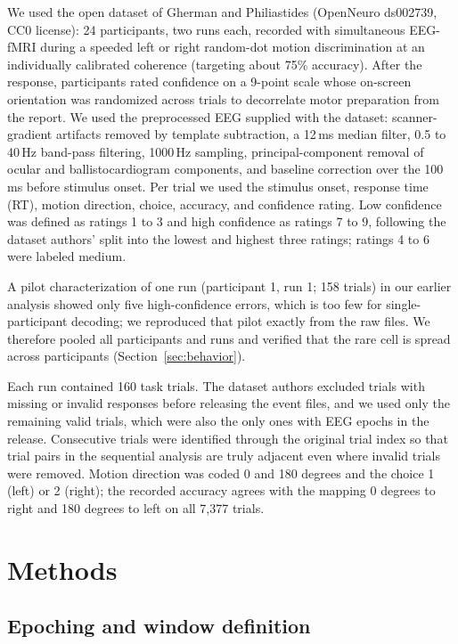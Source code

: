 \documentclass[11pt,a4paper]{article}
\begin{document}
We used the open dataset of Gherman and Philiastides \cite{r1,r2} (OpenNeuro ds002739, CC0 license): 24 participants, two runs each, recorded with simultaneous EEG-fMRI during a speeded left or right random-dot motion discrimination at an individually calibrated coherence (targeting about 75\% accuracy). After the response, participants rated confidence on a 9-point scale whose on-screen orientation was randomized across trials to decorrelate motor preparation from the report. We used the preprocessed EEG supplied with the dataset: scanner-gradient artifacts removed by template subtraction, a 12\,ms median filter, 0.5 to 40\,Hz band-pass filtering, 1000\,Hz sampling, principal-component removal of ocular and ballistocardiogram components, and baseline correction over the 100\,ms before stimulus onset. Per trial we used the stimulus onset, response time (RT), motion direction, choice, accuracy, and confidence rating. Low confidence was defined as ratings 1 to 3 and high confidence as ratings 7 to 9, following the dataset authors' split into the lowest and highest three ratings; ratings 4 to 6 were labeled medium.

A pilot characterization of one run (participant 1, run 1; 158 trials) in our earlier analysis showed only five high-confidence errors, which is too few for single-participant decoding; we reproduced that pilot exactly from the raw files. We therefore pooled all participants and runs and verified that the rare cell is spread across participants (Section~\ref{sec:behavior}).

Each run contained 160 task trials. The dataset authors excluded trials with missing or invalid responses before releasing the event files, and we used only the remaining valid trials, which were also the only ones with EEG epochs in the release. Consecutive trials were identified through the original trial index so that trial pairs in the sequential analysis are truly adjacent even where invalid trials were removed. Motion direction was coded 0 and 180 degrees and the choice 1 (left) or 2 (right); the recorded accuracy agrees with the mapping 0 degrees to right and 180 degrees to left on all 7,377 trials.

\section{Methods}

\subsection{Epoching and window definition}
\end{document}
